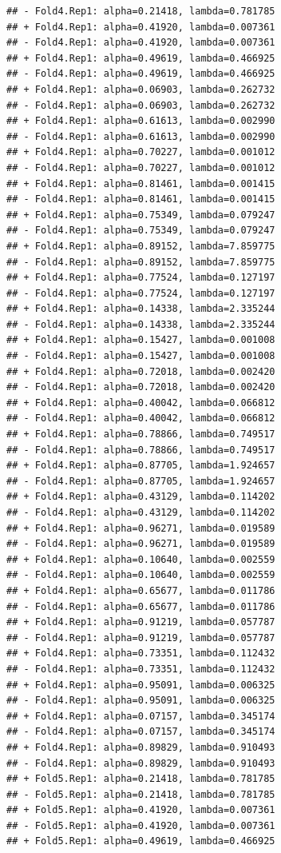 \documentclass[
]{article}
\begin{document}
\begin{verbatim}
## - Fold4.Rep1: alpha=0.21418, lambda=0.781785 
## + Fold4.Rep1: alpha=0.41920, lambda=0.007361 
## - Fold4.Rep1: alpha=0.41920, lambda=0.007361 
## + Fold4.Rep1: alpha=0.49619, lambda=0.466925 
## - Fold4.Rep1: alpha=0.49619, lambda=0.466925 
## + Fold4.Rep1: alpha=0.06903, lambda=0.262732 
## - Fold4.Rep1: alpha=0.06903, lambda=0.262732 
## + Fold4.Rep1: alpha=0.61613, lambda=0.002990 
## - Fold4.Rep1: alpha=0.61613, lambda=0.002990 
## + Fold4.Rep1: alpha=0.70227, lambda=0.001012 
## - Fold4.Rep1: alpha=0.70227, lambda=0.001012 
## + Fold4.Rep1: alpha=0.81461, lambda=0.001415 
## - Fold4.Rep1: alpha=0.81461, lambda=0.001415 
## + Fold4.Rep1: alpha=0.75349, lambda=0.079247 
## - Fold4.Rep1: alpha=0.75349, lambda=0.079247 
## + Fold4.Rep1: alpha=0.89152, lambda=7.859775 
## - Fold4.Rep1: alpha=0.89152, lambda=7.859775 
## + Fold4.Rep1: alpha=0.77524, lambda=0.127197 
## - Fold4.Rep1: alpha=0.77524, lambda=0.127197 
## + Fold4.Rep1: alpha=0.14338, lambda=2.335244 
## - Fold4.Rep1: alpha=0.14338, lambda=2.335244 
## + Fold4.Rep1: alpha=0.15427, lambda=0.001008 
## - Fold4.Rep1: alpha=0.15427, lambda=0.001008 
## + Fold4.Rep1: alpha=0.72018, lambda=0.002420 
## - Fold4.Rep1: alpha=0.72018, lambda=0.002420 
## + Fold4.Rep1: alpha=0.40042, lambda=0.066812 
## - Fold4.Rep1: alpha=0.40042, lambda=0.066812 
## + Fold4.Rep1: alpha=0.78866, lambda=0.749517 
## - Fold4.Rep1: alpha=0.78866, lambda=0.749517 
## + Fold4.Rep1: alpha=0.87705, lambda=1.924657 
## - Fold4.Rep1: alpha=0.87705, lambda=1.924657 
## + Fold4.Rep1: alpha=0.43129, lambda=0.114202 
## - Fold4.Rep1: alpha=0.43129, lambda=0.114202 
## + Fold4.Rep1: alpha=0.96271, lambda=0.019589 
## - Fold4.Rep1: alpha=0.96271, lambda=0.019589 
## + Fold4.Rep1: alpha=0.10640, lambda=0.002559 
## - Fold4.Rep1: alpha=0.10640, lambda=0.002559 
## + Fold4.Rep1: alpha=0.65677, lambda=0.011786 
## - Fold4.Rep1: alpha=0.65677, lambda=0.011786 
## + Fold4.Rep1: alpha=0.91219, lambda=0.057787 
## - Fold4.Rep1: alpha=0.91219, lambda=0.057787 
## + Fold4.Rep1: alpha=0.73351, lambda=0.112432 
## - Fold4.Rep1: alpha=0.73351, lambda=0.112432 
## + Fold4.Rep1: alpha=0.95091, lambda=0.006325 
## - Fold4.Rep1: alpha=0.95091, lambda=0.006325 
## + Fold4.Rep1: alpha=0.07157, lambda=0.345174 
## - Fold4.Rep1: alpha=0.07157, lambda=0.345174 
## + Fold4.Rep1: alpha=0.89829, lambda=0.910493 
## - Fold4.Rep1: alpha=0.89829, lambda=0.910493 
## + Fold5.Rep1: alpha=0.21418, lambda=0.781785 
## - Fold5.Rep1: alpha=0.21418, lambda=0.781785 
## + Fold5.Rep1: alpha=0.41920, lambda=0.007361 
## - Fold5.Rep1: alpha=0.41920, lambda=0.007361 
## + Fold5.Rep1: alpha=0.49619, lambda=0.466925 

\end{verbatim}
\end{document}
